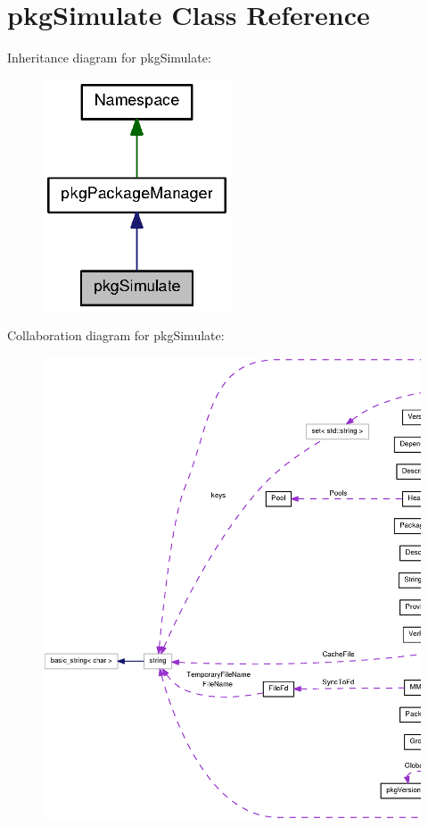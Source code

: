 \section{pkg\-Simulate \-Class \-Reference}
\label{classpkgSimulate}


\-Inheritance diagram for pkg\-Simulate\-:
\nopagebreak
\begin{figure}[H]
\begin{center}
\leavevmode
\includegraphics[width=158pt]{classpkgSimulate__inherit__graph}
\end{center}
\end{figure}


\-Collaboration diagram for pkg\-Simulate\-:
\nopagebreak
\begin{figure}[H]
\begin{center}
\leavevmode
\includegraphics[width=350pt]{classpkgSimulate__coll__graph}
\end{center}
\end{figure}
